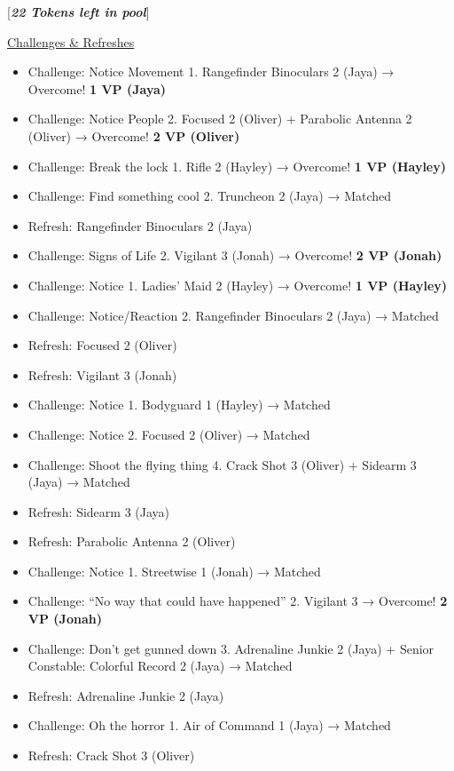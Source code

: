 {[}\textit{\textbf{22 Tokens left in pool}}{]}





\underline{  {\LARGE Challenges \& Refreshes }  }



\begin{itemize}
\item Challenge: Notice Movement 1.  Rangefinder Binoculars 2 (Jaya) → Overcome! \textbf{1 VP (Jaya)}
\item Challenge: Notice People 2.  Focused 2 (Oliver) + Parabolic Antenna 2 (Oliver) → Overcome! \textbf{2 VP (Oliver)}
\item Challenge: Break the lock 1.  Rifle 2 (Hayley) → Overcome! \textbf{1 VP (Hayley)}
\item Challenge: Find something cool 2. Truncheon 2 (Jaya) →  Matched
\item Refresh: Rangefinder Binoculars 2 (Jaya)
\item Challenge: Signs of Life 2.  Vigilant 3 (Jonah) → Overcome! \textbf{2 VP (Jonah)}
\item Challenge: Notice 1.  Ladies' Maid 2 (Hayley) → Overcome! \textbf{1 VP (Hayley)}
\item Challenge: Notice/Reaction 2.  Rangefinder Binoculars 2 (Jaya) → Matched
\item Refresh: Focused 2 (Oliver)
\item Refresh: Vigilant 3 (Jonah)
\item Challenge: Notice 1. Bodyguard 1 (Hayley) → Matched
\item Challenge: Notice 2. Focused 2 (Oliver) → Matched
\item Challenge: Shoot the flying thing 4.  Crack Shot 3 (Oliver) + Sidearm 3 (Jaya) → Matched
\item Refresh: Sidearm 3 (Jaya)
\item Refresh: Parabolic Antenna 2 (Oliver)
\item Challenge: Notice 1. Streetwise 1 (Jonah) → Matched
\item Challenge: ``No way that could have happened'' 2. Vigilant 3 → Overcome! \textbf{2 VP (Jonah)}
\item Challenge: Don't get gunned down 3. Adrenaline Junkie 2 (Jaya) + Senior Constable: Colorful Record 2 (Jaya) → Matched
\item Refresh: Adrenaline Junkie 2 (Jaya)
\item Challenge: Oh the horror 1.  Air of Command 1 (Jaya) → Matched
\item Refresh: Crack Shot 3 (Oliver)

\end{itemize}
